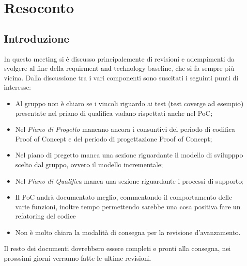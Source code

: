 \section{Resoconto}
\subsection{Introduzione}
In questo meeting si è discusso principalemente di revisioni e adempimenti da svolgere al fine della requirment and technology baseline, che si fa sempre più vicina. Dalla discussione tra i vari componenti sono suscitati i seguinti punti di interesse:

\begin{itemize}
\item Al gruppo non è chiaro se i vincoli riguardo ai test (test coverge ad esempio) presentate nel priano di qualifica vadano rispettati anche nel PoC;
\item Nel \textit{Piano di Progetto} mancano ancora i consuntivi del periodo di codifica Proof of Concept e del periodo di progettazione Proof of Concept;
\item Nel piano di pregetto manca una sezione riguardante il modello di svilupppo scelto dal gruppo, ovvero il modello incrementale;
\item Nel \textit{Piano di Qualifica} manca una sezione riguardante i processi di supporto;
\item Il PoC andrà documentato meglio, commentando il comportamento delle varie funzioni, inoltre tempo permettendo sarebbe una cosa positiva fare un refatoring del codice
\item Non è molto chiara la modalità di consegna per la revisione d'avanzamento.
\end{itemize}

Il resto dei documenti dovrebbero essere completi e pronti alla consegna, nei prosssimi giorni verranno fatte le ultime revisioni.
